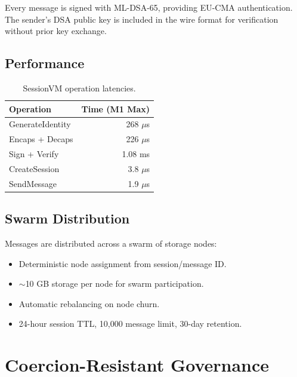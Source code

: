 \documentclass[11pt,letterpaper]{article}
\begin{document}
\begin{theorem}[Authentication]
Every message is signed with ML-DSA-65, providing EU-CMA authentication. The sender's DSA public key is included in the wire format for verification without prior key exchange.
\end{theorem}

\subsection{Performance}

\begin{table}[H]
\centering
\begin{tabular}{@{}lr@{}}
\toprule
\textbf{Operation} & \textbf{Time (M1 Max)} \\
\midrule
GenerateIdentity & 268 $\mu$s \\
Encaps + Decaps & 226 $\mu$s \\
Sign + Verify & 1.08 ms \\
CreateSession & 3.8 $\mu$s \\
SendMessage & 1.9 $\mu$s \\
\bottomrule
\end{tabular}
\caption{SessionVM operation latencies.}
\label{tab:session-perf}
\end{table}

\subsection{Swarm Distribution}

Messages are distributed across a swarm of storage nodes:
\begin{itemize}
\item Deterministic node assignment from session/message ID.
\item $\sim$10 GB storage per node for swarm participation.
\item Automatic rebalancing on node churn.
\item 24-hour session TTL, 10,000 message limit, 30-day retention.
\end{itemize}

\section{Coercion-Resistant Governance}
\end{document}
